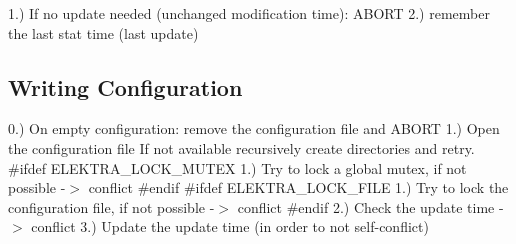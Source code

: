 1.) If no update needed (unchanged modification time)\+: A\+B\+O\+R\+T 2.) remember the last stat time (last update)

\subsection*{Writing Configuration}

0.) On empty configuration\+: remove the configuration file and A\+B\+O\+R\+T 1.) Open the configuration file If not available recursively create directories and retry. \#ifdef E\+L\+E\+K\+T\+R\+A\+\_\+\+L\+O\+C\+K\+\_\+\+M\+U\+T\+E\+X 1.) Try to lock a global mutex, if not possible -\/$>$ conflict \#endif \#ifdef E\+L\+E\+K\+T\+R\+A\+\_\+\+L\+O\+C\+K\+\_\+\+F\+I\+L\+E 1.) Try to lock the configuration file, if not possible -\/$>$ conflict \#endif 2.) Check the update time -\/$>$ conflict 3.) Update the update time (in order to not self-\/conflict) 